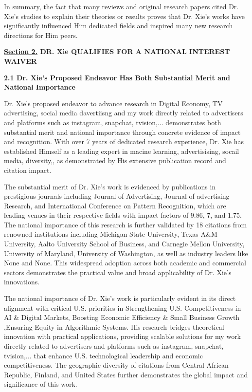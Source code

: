 \documentclass{article}
\begin{document}
In summary, the fact that many reviews and original research papers cited Dr. Xie's studies to explain their theories or results proves that Dr. Xie's works have significantly influenced Him dedicated fields and inspired many new research directions for Him peers.







{\bf \underline{Section 2.} DR. Xie QUALIFIES FOR A NATIONAL INTEREST WAIVER}

{\bf 2.1 Dr. Xie's Proposed Endeavor Has Both Substantial Merit and National Importance}

Dr. Xie's proposed endeavor to advance research in Digital Economy, TV advertising, social media davertiisng and my work directly related to advertisers and platforms such as instagram, snapchat, tvision,... demonstrates both substantial merit and national importance through concrete evidence of impact and recognition. With over 7 years of dedicated research experience, Dr. Xie has established Himself as a leading expert in macine learning, advertisising, socail media, diversity,, as demonstrated by His extensive publication record and citation impact.

The substantial merit of Dr. Xie's work is evidenced by publications in prestigious journals including Journal of Advertising, Journal of advertising Research, and International Conference on Pattern Recognition, which are leading venues in their respective fields with impact factors of 9.86, 7, and 1.75. The national importance of this research is further validated by 18 citations from renowned institutions including Michigan State University, Texas A\&M University, Aalto University School of Business, and Carnegie Mellon University, University of Maryland, University of Washington, as well as industry leaders like None and None. This widespread adoption across both academic and commercial sectors demonstrates the practical value and broad applicability of Dr. Xie's innovations.

The national importance of Dr. Xie's work is particularly evident in its direct alignment with critical U.S. priorities in Strengthening U.S. Competitiveness in AI \& Digital Markets, Boosting Economic Efficiency \& Small Business Growth ,Ensuring Equity in Algorithmic Systems. His research bridges theoretical innovation with practical applications, providing scalable solutions for my work directly related to advertisers and platforms such as instagram, snapchat, tvision,... that enhance U.S. technological leadership and economic competitiveness. The geographic diversity of citations from Central African Republic, Finland, and United States further demonstrates the global impact and significance of this work.
\end{document}
